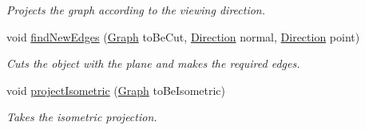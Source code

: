 \begin{DoxyCompactItemize}
\begin{DoxyCompactList}\small\item\em Projects the graph according to the viewing direction. \end{DoxyCompactList}\item 
void \mbox{\hyperlink{classthreeto2d_a1682583c1deb5775be8c3591abe51873}{find\+New\+Edges}} (\mbox{\hyperlink{class_graph}{Graph}} to\+Be\+Cut, \mbox{\hyperlink{struct_direction}{Direction}} normal, \mbox{\hyperlink{struct_direction}{Direction}} point)
\begin{DoxyCompactList}\small\item\em Cuts the object with the plane and makes the required edges. \end{DoxyCompactList}\item 
\mbox{\label{classthreeto2d_a5ae012cce3c625ebcbf9ff050335b4d0}} 
void \mbox{\hyperlink{classthreeto2d_a5ae012cce3c625ebcbf9ff050335b4d0}{project\+Isometric}} (\mbox{\hyperlink{class_graph}{Graph}} to\+Be\+Isometric)
\begin{DoxyCompactList}\small\item\em Takes the isometric projection. \end{DoxyCompactList}\end{DoxyCompactItemize}
